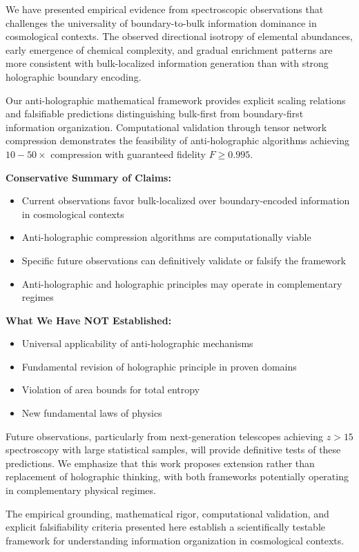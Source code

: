 \documentclass[twocolumn,aps,prd,superscriptaddress,nofootinbib]{revtex4-2}
\begin{document}
We have presented empirical evidence from spectroscopic observations that challenges the universality of boundary-to-bulk information dominance in cosmological contexts. The observed directional isotropy of elemental abundances, early emergence of chemical complexity, and gradual enrichment patterns are more consistent with bulk-localized information generation than with strong holographic boundary encoding.

Our anti-holographic mathematical framework provides explicit scaling relations and falsifiable predictions distinguishing bulk-first from boundary-first information organization. Computational validation through tensor network compression demonstrates the feasibility of anti-holographic algorithms achieving $10-50\times$ compression with guaranteed fidelity $F \geq 0.995$.

\textbf{Conservative Summary of Claims:}
\begin{itemize}
    \item Current observations favor bulk-localized over boundary-encoded information in cosmological contexts
    \item Anti-holographic compression algorithms are computationally viable
    \item Specific future observations can definitively validate or falsify the framework
    \item Anti-holographic and holographic principles may operate in complementary regimes
\end{itemize}

\textbf{What We Have NOT Established:}
\begin{itemize}
    \item Universal applicability of anti-holographic mechanisms
    \item Fundamental revision of holographic principle in proven domains
    \item Violation of area bounds for total entropy
    \item New fundamental laws of physics
\end{itemize}

Future observations, particularly from next-generation telescopes achieving $z > 15$ spectroscopy with large statistical samples, will provide definitive tests of these predictions. We emphasize that this work proposes extension rather than replacement of holographic thinking, with both frameworks potentially operating in complementary physical regimes.

The empirical grounding, mathematical rigor, computational validation, and explicit falsifiability criteria presented here establish a scientifically testable framework for understanding information organization in cosmological contexts.
\end{document}
